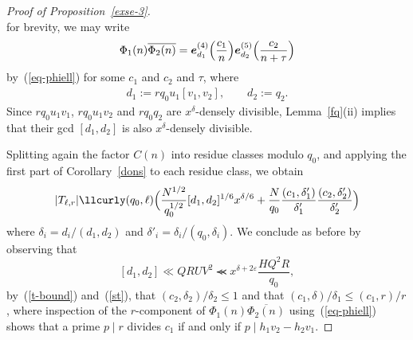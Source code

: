 \documentclass[12pt,a4paper,reqno]{amsart}
\numberwithin{equation}{section}
\theoremstyle{plain}
\theoremstyle{definition}
\newcommand\eps{\varepsilon}
\newcommand{\uple}[1]{\text{\boldmath${#1}$}}
\renewcommand{\lessapprox}{\llcurly}
\newcommand{\onef}{\mathbf{1}}
\begin{document}
\begin{proof}[Proof of Proposition~\ref{exse-3}]
$$$$
for brevity, we may write
$$
\Phi_1(n)\overline{\Phi_2(n)}= \uple{e}^{(4)}_{d_1} \Bigl( \frac{c_1}{n}
\Bigr) \uple{e}_{d_2}^{(5)}\Bigl( \frac{c_2}{n+\tau} \Bigr)
$$
by~(\ref{eq-phiell}) for some $c_1$ and $c_2$ and $\tau$, where
\begin{gather*}
  d_1 := r q_0u_1[v_1,v_2],\quad\quad d_2 := q_2.
\end{gather*}
Since $rq_0u_1v_1$, $rq_0u_1v_2$ and $rq_0q_2$ are
$x^{\delta}$-densely divisible, Lemma~\ref{fq}(ii) implies that their
gcd $[d_1,d_2]$ is also $x^{\delta}$-densely divisible.
\par
Splitting again the factor $C(n)$ into residue classes modulo $q_0$,
and applying the first part of Corollary~\ref{dons} to each residue class,
we obtain
$$
|T_{\ell,r}|\lessapprox (q_0,\ell) \Bigl( \frac{N^{1/2}}{q_0^{1/2}}
[d_1,d_2]^{1/6} x^{\delta/6} +
\frac{N}{q_0}\frac{(c_1,\delta'_1)}{\delta'_1}
\frac{(c_2,\delta'_2)}{\delta'_2} \Bigr)
$$
where $\delta_i=d_i/(d_1,d_2)$ and $\delta'_i = \delta_i / (q_0,\delta_i)$. We conclude as before by observing
that 
$$
[d_1,d_2]\ll QRUV^2\lessapprox x^{\delta+2\eps}\frac{HQ^2R}{q_0},
$$
by~(\ref{t-bound}) and~(\ref{st}), that $(c_2,\delta_2)/\delta_2\leq
1$ and that $(c_1,\delta)/\delta_1\leq(c_1,r)/r$, where inspection of
the $r$-component of $\Phi_1(n)\overline{\Phi_2(n)}$
using~(\ref{eq-phiell}) shows that a prime $p\mid r$ divides $c_1$ if
and only if $p\mid h_1v_2-h_2v_1$.
\end{proof}






\end{document}
